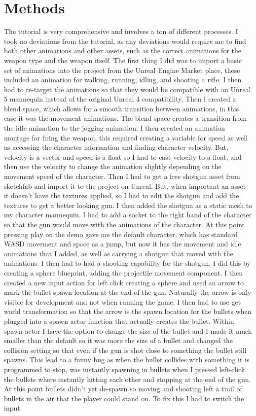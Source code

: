 \documentclass[10pt, twocolumn]{article}
\begin{document}
 \section{Methods}
 The tutorial is very comprehensive and involves a ton of different processes. I took no deviations from the tutorial, as any deviations would require me to find both other animations and other assets, such as the correct animations for the weapon type and the weapon itself. The first thing I did was to import a basic set of animations into the project from the Unreal Engine Market place, these included an animation for walking, running, idling, and shooting a rifle. I then had to re-target the animations so that they would be compatible with an Unreal 5 mannequin instead of the original Unreal 4 compatibility. Then I created a blend space, which allows for a smooth transition between animations, in this case it was the movement animations. The blend space creates a transition from the idle animation to the jogging animation. I then created an animation montage for firing the weapon, this required creating a variable for speed as well as accessing the character information and finding character velocity. But, velocity is a vector and speed is a float so I had to cast velocity to a float, and then use the velocity to change the animation slightly depending on the movement speed of the character. Then I had to get a free shotgun asset from sketchfab and import it to the project on Unreal. But, when important an asset it doesn't have the textures applied, so I had to edit the shotgun and add the textures to get a better looking gun. I then added the shotgun as a static mesh to my character mannequin. I had to add a socket to the right hand of the character so that the gun would move with the animations of the character. At this point pressing play on the demo gave me the default character, which has standard WASD movement and space as a jump, but now it has the movement and idle animations that I added, as well as carrying a shotgun that moved with the animations. I then had to had a shooting capability for the shotgun. I did this by creating a sphere blueprint, adding the projectile movement component. I then created a new input action for left click creating a sphere and used an arrow to mark the bullet spawn location at the end of the gun. Naturally the arrow is only visible for development and not when running the game. I then had to use get world transformation so that the arrow is the spawn location for the bullets when plugged into a spawn actor function that actually creates the bullet. Within spawn actor I have the option to change the size of the bullet and I made it much smaller than the default so it was more the size of a bullet and changed the collision setting so that even if the gun is shot close to something the bullet still spawns. This lead to a funny bug as when the bullet collides with something it is programmed to stop, was instantly spawning in bullets when I pressed left-click the bullets where instantly hitting each other and stopping at the end of the gun. At this point bullets didn't yet de-spawn so moving and shooting left a trail of bullets in the air that the player could stand on.  To fix this I had to switch the input 
\end{document}
